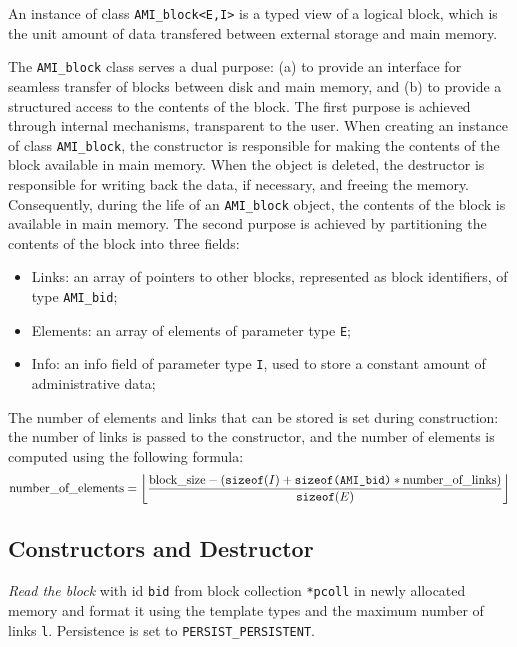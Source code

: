 An instance of class \lstinline|AMI_block<E,I>| is a typed
view of a logical block, which is the unit amount of data transfered
between external storage and main memory. 

The \lstinline|AMI_block| class serves a dual purpose: (a) to provide an
interface for seamless transfer of blocks between disk and main memory,
and (b) to provide a structured access to the contents of the block.
The first purpose is achieved through internal mechanisms, transparent
to the user. When creating an instance of class \lstinline|AMI_block|, the
constructor is responsible for making the contents of the block
available in main memory. When the object is deleted, the destructor is
responsible for writing back the data, if necessary, and freeing the
memory. Consequently, during the life of an \lstinline|AMI_block| object, the
contents of the block is available in main memory.
The second purpose is achieved by partitioning the contents of the block
into three fields:
\begin{itemize}
\item[] Links: an array of pointers to other blocks, represented as
block identifiers, of type \lstinline|AMI_bid|;
\item[] Elements: an array of elements of parameter type \lstinline|E|;
\item[] Info: an info field of parameter type \lstinline|I|, used to store a 
constant amount of administrative data;
\end{itemize}

The number of elements and links that can be stored is set during
construction: the number of links is passed to the constructor, and the
number of elements is computed using the following formula:
\[\mbox{\rm number\_of\_elements} = \left\lfloor\frac{\mbox{\rm
block\_size} - (\mbox{\tt sizeof}(I) + \mbox{\tt sizeof(AMI\_bid)} *
\mbox{\rm number\_of\_links})}{\mbox{\tt sizeof}(E)}\right\rfloor \]

\subsection{Constructors and Destructor}

   \btabb 

         {{\em Read the block} with id \lstinline|bid| from block collection
        \lstinline|*pcoll| in newly allocated memory and format it using the
        template types and the maximum number of links \lstinline|l|.
        Persistence is set to \lstinline|PERSIST_PERSISTENT|.}

